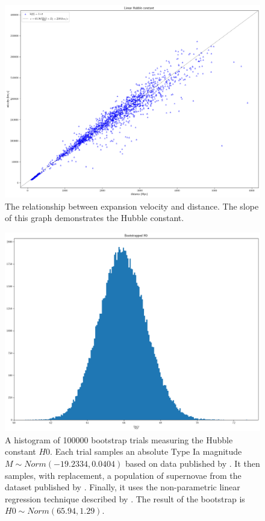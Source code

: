 \documentclass{article}
\begin{document}
\begin{figure}[h!]
  \includegraphics[width=\linewidth]{velocity_vs_distance.png}
  \caption{The relationship between expansion velocity and distance. The slope of this graph demonstrates the Hubble constant.
  }
  \label{fig:mu_distance_vs_redshift}
\end{figure}

\begin{figure}[h!]
  \includegraphics[width=\linewidth]{bootstrapped_H0.png}
  \caption{A histogram of 100000 bootstrap trials measuring the Hubble constant
  $H0$. Each trial samples an absolute Type Ia magnitude $M \sim Norm(-19.2334,
  0.0404)$ based on data published by \citet{camarena2020}. It then samples,
  with replacement, a population of supernovae from the dataset published by
  \citet{abbott2024}. Finally, it uses the non-parametric linear regression
  technique described by \citet{siegel1982}. The result of the bootstrap is $H0
  \sim Norm(65.94, 1.29)$.
  }
  \label{fig:mu_distance_vs_redshift}
\end{figure}
\end{document}
